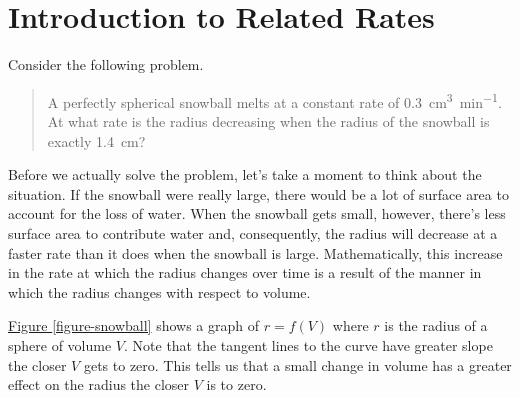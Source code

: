\documentclass[12pt,]{book}
\theoremstyle{plain}
\theoremstyle{definition}
\numberwithin{equation}{section}
\newcounter{figstack}
\newcounter{figindex}
\newlength\fight
\newcommand\pushValignCaptionBottom[5][b]{%
\stepcounter{figstack}%
\expandafter\def\csname %
figalign\romannumeral\value{figstack}\endcsname{#1}%
\expandafter\def\csname %
figtype\romannumeral\value{figstack}\endcsname{#2}%
\expandafter\def\csname %
figwd\romannumeral\value{figstack}\endcsname{#3}%
\expandafter\def\csname %
figcontent\romannumeral\value{figstack}\endcsname{#4}%
\expandafter\def\csname %
figcap\romannumeral\value{figstack}\endcsname{#5}%
\setbox0=\hbox{%
\begin{#2}{#3}#4\end{#2}}%
\ifdim\dimexpr\ht0+\dp0\relax>\fight\global\setlength{\fight}{%
\dimexpr\ht0+\dp0\relax}\fi%
}
\newcommand\popValignCaptionBottom{%
\setcounter{figindex}{0}%
\hfill%
\whiledo{\value{figindex}<\value{figstack}}{%
\stepcounter{figindex}%
\def\tmp{\csname figwd\romannumeral\value{figindex}\endcsname}%
\begin{\csname figtype\romannumeral\value{figindex}\endcsname}[t]{\tmp}%
\centering%
\stackinset{c}{}%
{\csname figalign\romannumeral\value{figindex}\endcsname}{}%
{\csname figcontent\romannumeral\value{figindex}\endcsname}%
{\rule{0pt}{\fight}}\par%
\csname figcap\romannumeral\value{figindex}\endcsname%
\end{\csname figtype\romannumeral\value{figindex}\endcsname}%
\hfill%
}%
\setcounter{figstack}{0}%
\setlength{\fight}{0pt}%
\hfill%
}
\newcommand{\fe}[2]{#1\mathopen{}\left(#2\right)\mathclose{}}
\begin{document}
\section[Introduction to Related Rates]{Introduction to Related Rates}\label{section-introduction-related-rates}
Consider the following problem.%
\begin{quote}A perfectly spherical snowball melts at a constant rate of \SI{0.3}{\centi\meter\tothe{3}\per\minute}. At what rate is the radius decreasing when the radius of the snowball is exactly \SI{1.4}{\centi\meter}?\end{quote}\par
Before we actually solve the problem, let's take a moment to think about the situation. If the snowball were really large, there would be a lot of surface area to account for the loss of water. When the snowball gets small, however, there's less surface area to contribute water and, consequently, the radius will decrease at a faster rate than it does when the snowball is large. Mathematically, this increase in the rate at which the radius changes over time is a result of the manner in which the radius changes with respect to volume.%
\par
\hyperref[figure-snowball]{Figure \ref{figure-snowball}} shows a graph of \(r=\fe{f}{V}\) where \(r\) is the radius of a sphere of volume \(V\). Note that the tangent lines to the curve have greater slope the closer \(V\) gets to zero. This tells us that a small change in volume has a greater effect on the radius the closer \(V\) is to zero. %
\end{document}
